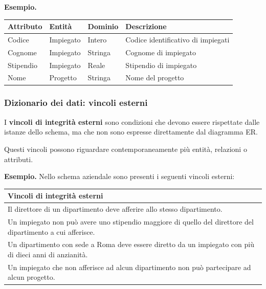 \noindent
\textcolor{verdeEsempio}{\textbf{Esempio. }}

\begin{center}
\noindent
\small
\begin{tabular}{|l|l|l|l|}
\hline
\textbf{Attributo} & \textbf{Entità} & \textbf{Dominio} & \textbf{Descrizione} \\
\hline
Codice & Impiegato & Intero & Codice identificativo di impiegati\\
\hline
Cognome & Impiegato & Stringa & Cognome di impiegato\\
\hline
Stipendio & Impiegato & Reale & Stipendio di impiegato\\
\hline
Nome & Progetto & Stringa & Nome del progetto\\
\hline
\end{tabular}
\end{center}

\subsubsection*{Dizionario dei dati: vincoli esterni}

\noindent
I \textbf{vincoli di integrità esterni} sono condizioni che devono
essere rispettate dalle istanze dello schema, ma che non sono
espresse direttamente dal diagramma ER.

\noindent
Questi vincoli possono riguardare contemporaneamente più entità,
relazioni o attributi.

\noindent
\textcolor{verdeEsempio}{\textbf{Esempio. }}
Nello schema aziendale sono presenti i seguenti vincoli esterni:

\begin{center}
\noindent
\small
\begin{tabular}{|l|}
\hline
\textbf{Vincoli di integrità esterni} \\
\hline
Il direttore di un dipartimento deve afferire allo stesso dipartimento.\\
\hline
Un impiegato non può avere uno stipendio maggiore di quello del direttore del dipartimento a cui afferisce.\\
\hline
Un dipartimento con sede a Roma deve essere diretto da un impiegato con più di dieci anni di anzianità.\\

\hline
Un impiegato che non afferisce ad alcun dipartimento non può partecipare ad alcun progetto.\\
\hline
\end{tabular}
\end{center}

